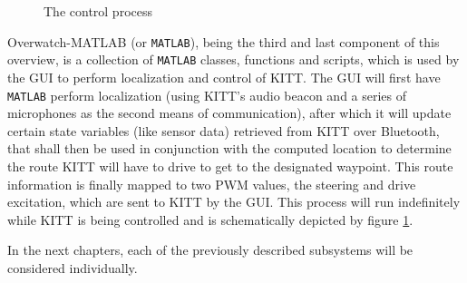 \documentclass[11pt,titlepage]{report}
\begin{document}
\begin{figure}[H]
	\centering
	
	\caption{The control process}
	\label{fig:system-overview-process}
\end{figure}

Overwatch-MATLAB (or \texttt{MATLAB}), being the third and last component of this overview, is a collection of \texttt{MATLAB} classes, functions and scripts, which is used by the GUI to perform localization and control of KITT. The GUI will first have \texttt{MATLAB} perform localization (using KITT's audio beacon and a series of microphones as the second means of communication), after which it will update certain state variables (like sensor data) retrieved from KITT over Bluetooth, that shall then be used in conjunction with the computed location to determine the route KITT will have to drive to get to the designated waypoint. This route information is finally mapped to two PWM values, the steering and drive excitation, which are sent to KITT by the GUI.
This process will run indefinitely while KITT is being controlled and is schematically depicted by figure \ref{fig:system-overview-process}.

In the next chapters, each of the previously described subsystems will be considered individually.
\end{document}
